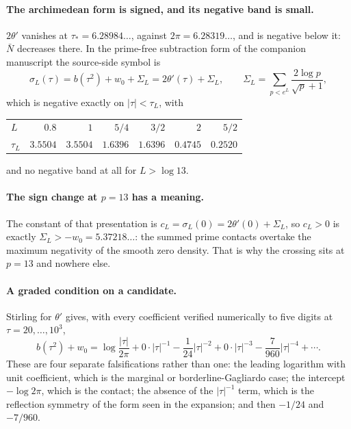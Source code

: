 \paragraph{The archimedean form is signed, and its negative band is small.}
$2\theta'$ vanishes at $\tau_*=6.28984\ldots$, against $2\pi=6.28319\ldots$, and
is negative below it: $\bar N$ decreases there. In the prime-free subtraction
form of the companion manuscript the source-side symbol is
\begin{equation}\label{eq:sigma}
 \sigma_L(\tau)=b(\tau^2)+w_0+\Sigma_L=2\theta'(\tau)+\Sigma_L,
 \qquad \Sigma_L=\sum_{p<e^L}\frac{2\log p}{\sqrt p+1},
\end{equation}
which is negative exactly on $|\tau|<\tau_L$, with
\begin{center}
\small
\begin{tabular}{lrrrrrr}
\toprule
$L$ & $0.8$ & $1$ & $5/4$ & $3/2$ & $2$ & $5/2$ \\
$\tau_L$ & $3.5504$ & $3.5504$ & $1.6396$ & $1.6396$ & $0.4745$ & $0.2520$\\
\bottomrule
\end{tabular}
\end{center}
and no negative band at all for $L>\log13$.

\paragraph{The sign change at $p=13$ has a meaning.}
The constant of that presentation is $c_L=\sigma_L(0)=2\theta'(0)+\Sigma_L$, so
$c_L>0$ is exactly $\Sigma_L>-w_0=5.37218\ldots$: the summed prime contacts
overtake the maximum negativity of the smooth zero density. That is why the
crossing sits at $p=13$ and nowhere else.

\paragraph{A graded condition on a candidate.}
Stirling for $\theta'$ gives, with every coefficient verified numerically to
five digits at $\tau=20,\dots,10^3$,
\begin{equation}\label{eq:graded}
 b(\tau^2)+w_0=\log\frac{|\tau|}{2\pi}+0\cdot|\tau|^{-1}-\frac1{24}|\tau|^{-2}
 +0\cdot|\tau|^{-3}-\frac7{960}|\tau|^{-4}+\cdots .
\end{equation}
These are four separate falsifications rather than one: the leading logarithm
with unit coefficient, which is the marginal or borderline-Gagliardo case; the
intercept $-\log2\pi$, which is the contact; the absence of the $|\tau|^{-1}$
term, which is the reflection symmetry of the form seen in the expansion; and
then $-1/24$ and $-7/960$.

